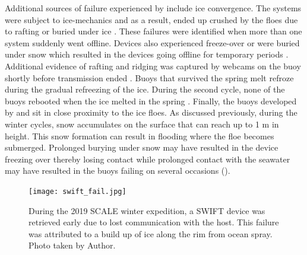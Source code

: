 Additional sources of failure experienced by \cite{doble2017robust} include ice convergence. The systems were subject to ice-mechanics and as a result, ended up crushed by the floes due to rafting or buried under ice \textcite{doble2017robust}. These failures were identified when more than one system suddenly went offline. Devices also experienced freeze-over or were buried under snow which resulted in the devices going offline for temporary periods \cite{doble2017robust}. Additional evidence of rafting and ridging was captured by webcams on the buoy shortly before transmission ended \cite{doble2017robust}. Buoys that survived the spring melt refroze during the gradual refreezing of the ice. During the second cycle, none of the buoys rebooted when the ice melted in the spring \cite{doble2017robust}. Finally, the buoys developed by \textcite{kohout2015device} and \textcite{rabault2017measurements} sit in close proximity to the ice floes. As discussed previously, during the winter cycles, snow accumulates on the surface that can reach up to 1 m in height. This snow formation can result in flooding where the floe becomes submerged. Prolonged burying under snow may have resulted in the device freezing over thereby losing contact while prolonged contact with the seawater may have resulted in the buoys failing on several occasions (\cite{kohout2015device,vichi2019effects,albarello2020drift,rabault2019open}).\par 

\begin{figure}[H]
	\centering
	\texttt{[image: swift\_fail.jpg]}
	\caption{During the 2019 SCALE winter expedition, a SWIFT device was retrieved early due to lost communication with the host. This failure was attributed to a build up of ice along the rim from ocean spray. Photo taken by Author.}
	\label{fig:swift_fail}
\end{figure}

